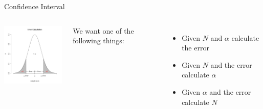 \begin{frame}{Confidence Interval}

  \begin{columns}

    \centerline{\includegraphics[width=4cm]{img/confidenceInterval}}


    We want one of the following things:
    \begin{itemize}
    \item Given $N$ and $\alpha$ calculate the error
    \item Given $N$ and the error calculate $\alpha$
    \item Given $\alpha$ and the error calculate $N$
    \end{itemize}

  \end{columns}
  
\end{frame}


